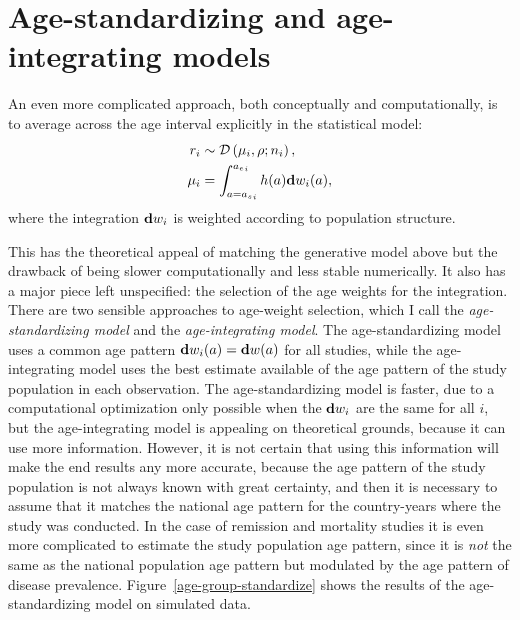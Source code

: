 \section{Age-standardizing and age-integrating models}
\label{age-standardizing}
An even more complicated approach, both conceptually and
computationally, is to average across the age interval explicitly in
the statistical model:
\begin{align*}
r_i &\sim \mathcal{D}\left(\mu_i, \rho; n_i\right),\\
\mu_i &= \int_{a={a_s}_i}^{{a_e}_i} h(a)\mathbf{d} w_i(a),
\end{align*}
where the integration $\mathbf{d} w_i$ is weighted according to population
structure.

This has the theoretical appeal of matching the generative model above
but the drawback of being slower computationally and less stable
numerically.  It also has a major piece left unspecified: the
selection of the age weights for the integration.  There are two
sensible approaches to age-weight selection, which I call the \emph{age-standardizing
  model} and the \emph{age-integrating model}.  The age-standardizing
model uses a common age pattern $\mathbf{d} w_i(a) = \mathbf{d} w(a)$ for all studies, while
the age-integrating model uses the best estimate available of the age
pattern of the study population in each observation.  The
age-standardizing model is faster, due to a computational optimization
only possible when the $\mathbf{d} w_i$ are the same for all $i$, but the
age-integrating model is appealing on theoretical grounds, because it
can use more information.  However, it is not certain that
using this information will make the end results any more accurate,
because the age pattern of the study population is not always known with
great certainty, and then it is necessary to assume that it matches
the national age pattern for the country-years where the study was
conducted.  In the case of remission and mortality studies it is even
more complicated to estimate the study population age pattern, since
it is \emph{not} the same as the national population age pattern but
modulated by the age pattern of disease prevalence.
Figure~\ref{age-group-standardize} shows the results of the age-standardizing model on
simulated data.

